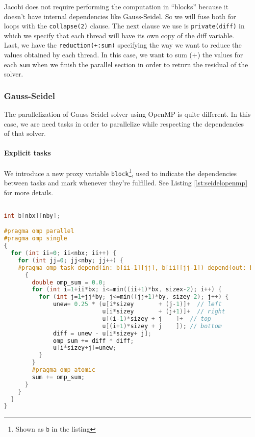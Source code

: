 \documentclass[a4paper, 10pt]{article}
\begin{document}
Jacobi does not require performing the computation in ``blocks'' because it doesn't have internal dependencies like Gauss-Seidel. 
So we will fuse both for loops with the \texttt{collapse(2)} clause. The next clause we use is \texttt{private(diff)} in which we specify 
that each thread will have its own copy of the diff variable. Last, we have the \texttt{reduction(+:sum)} specifying 
the way we want to reduce the values obtained by each thread. In this case, we want to sum (+) the values for each \texttt{sum} when we 
finish the parallel section in order to return the residual of the solver.

\clearpage

\subsubsection{Gauss-Seidel}

The parallelization of Gauss-Seidel solver using OpenMP is quite different. In this case, we are need tasks in order to parallelize while 
respecting the dependencies of that solver. 

\paragraph{Explicit tasks\\}


We introduce a new proxy variable \texttt{block}\footnote{Shown as \texttt{b} in the listing}, used to indicate the dependencies between tasks and mark whenever they're fulfilled. See Listing \ref{lst:seidelopenmp} for more details.

\begin{lstlisting}[language=c, caption={OpenMP pragma for Gauss-Seidel parallelization}, label={lst:seidelopenmp}]

int b[nbx][nby];

#pragma omp parallel
#pragma omp single
{
  for (int ii=0; ii<nbx; ii++) {
    for (int jj=0; jj<nby; jj++) {
    #pragma omp task depend(in: b[ii-1][jj], b[ii][jj-1]) depend(out: b[ii][jj]) private(diff, unew) 
      {
        double omp_sum = 0.0;
        for (int i=1+ii*bx; i<=min((ii+1)*bx, sizex-2); i++) {
          for (int j=1+jj*by; j<=min((jj+1)*by, sizey-2); j++) {
              unew= 0.25 * (u[i*sizey	    + (j-1)]+  // left
                            u[i*sizey	    + (j+1)]+  // right
                            u[(i-1)*sizey + j    ]+  // top
                            u[(i+1)*sizey + j    ]); // bottom
              diff = unew - u[i*sizey+ j];
              omp_sum += diff * diff; 
              u[i*sizey+j]=unew;
          } 
        }
        #pragma omp atomic
        sum += omp_sum;
      }
    }
  }
}
\end{lstlisting}
\end{document}

